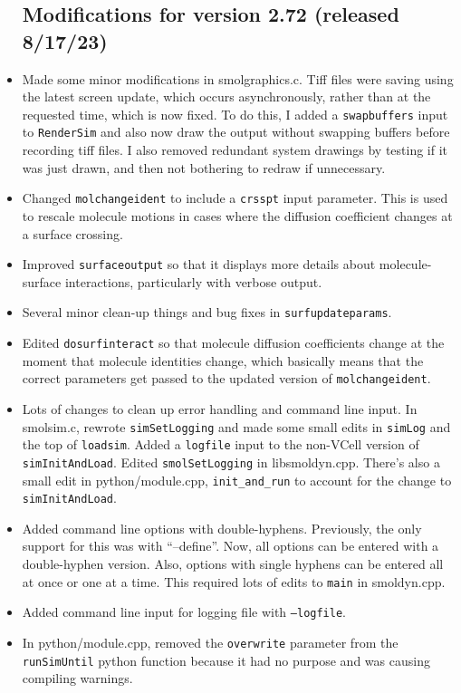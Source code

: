 \documentclass {scrbook}
\newcommand {\ttt} {\texttt}
\begin{document}
\begin{itemize}
\subsection{Modifications for version 2.72 (released 8/17/23)}
\item Made some minor modifications in smolgraphics.c. Tiff files were saving using the latest screen update, which occurs asynchronously, rather than at the requested time, which is now fixed. To do this, I added a \ttt{swapbuffers} input to \ttt{RenderSim} and also now draw the output without swapping buffers before recording tiff files. I also removed redundant system drawings by testing if it was just drawn, and then not bothering to redraw if unnecessary.
\item Changed \ttt{molchangeident} to include a \ttt{crsspt} input parameter. This is used to rescale molecule motions in cases where the diffusion coefficient changes at a surface crossing.
\item Improved \ttt{surfaceoutput} so that it displays more details about molecule-surface interactions, particularly with verbose output.
\item Several minor clean-up things and bug fixes in \ttt{surfupdateparams}.
\item Edited \ttt{dosurfinteract} so that molecule diffusion coefficients change at the moment that molecule identities change, which basically means that the correct parameters get passed to the updated version of \ttt{molchangeident}.
\item Lots of changes to clean up error handling and command line input. In smolsim.c, rewrote \ttt{simSetLogging} and made some small edits in \ttt{simLog} and the top of \ttt{loadsim}. Added a \ttt{logfile} input to the non-VCell version of \ttt{simInitAndLoad}. Edited \ttt{smolSetLogging} in libsmoldyn.cpp. There's also a small edit in python/module.cpp, \ttt{init\_and\_run} to account for the change to \ttt{simInitAndLoad}.
\item Added command line options with double-hyphens. Previously, the only support for this was with ``--define''. Now, all options can be entered with a double-hyphen version. Also, options with single hyphens can be entered all at once or one at a time. This required lots of edits to \ttt{main} in smoldyn.cpp.
\item Added command line input for logging file with \ttt{--logfile}.
\item In python/module.cpp, removed the \ttt{overwrite} parameter from the \ttt{runSimUntil} python function because it had no purpose and was causing compiling warnings.

\end{itemize}
\end{document}
